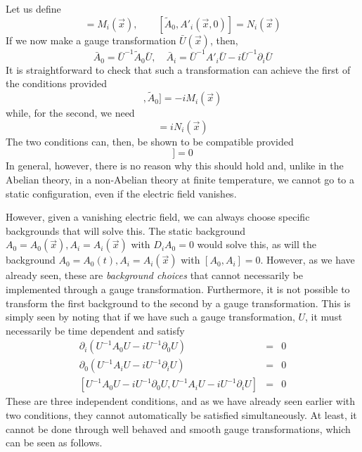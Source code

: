 \documentclass[a4paper,12pt]{article}
\begin{document}
Let us define
\begin{equation}
[\tilde{A}_{0},(\partial_{i}\tilde{A}_{0})] = M_{i}(\vec{x}),\qquad
[\tilde{A}_{0}, A'_{i}(\vec{x},0)] = N_{i}(\vec{x})
\end{equation}
If we now make a gauge transformation $\bar{U}(\vec{x})$, then,
\begin{equation}
\bar{A}_{0} = \bar{U}^{-1}\tilde{A}_{0}\bar{U},\quad \bar{A}_{i} =
\bar{U}^{-1}A'_{i}\bar{U} - i\bar{U}^{-1}\partial_{i}\bar{U}
\end{equation}
It is straightforward to check that such a transformation can achieve
the first of the conditions provided
\begin{equation}
[[\tilde{A}_{0},(\partial_{i}\bar{U})\bar{U}^{-1}],\tilde{A}_{0}] =
-i M_{i}(\vec{x})
\end{equation}
while, for the second, we need
\begin{equation}
[\tilde{A}_{0}, (\partial_{i}\bar{U})\bar{U}^{-1}] = i N_{i}(\vec{x})
\end{equation}
The two conditions can, then, be shown to be compatible provided
\begin{equation}
[\tilde{A}_{0}, \partial_{i}\tilde{A}_{0} +
i[A'_{i}(\vec{x},0),\tilde{A}_{0}]] = 0
\end{equation}
In general, however, there is no reason why this should
hold and, unlike in the Abelian theory, in a non-Abelian theory at
finite temperature, we cannot go to a static configuration, even if
the electric field vanishes.

However, given a vanishing electric field, we can always choose
specific backgrounds that will solve this. The static background
$A_{0}=A_{0}(\vec{x}),A_{i}=A_{i}(\vec{x})$ with $D_{i}A_{0} = 0$
would solve this, as will the background
$A_{0}=A_{0}(t),A_{i}=A_{i}(\vec{x})$ with $[A_{0},A_{i}]=0$. However,
as we have already seen,
these are {\em background choices} that cannot necessarily be implemented
through a gauge transformation. Furthermore, it is not possible to
transform the first background to the second by a gauge
transformation. This is simply seen by noting that if we have such a
gauge  transformation, $U$, it must necessarily be time dependent and
satisfy
\begin{eqnarray}
\partial_{i}\left(U^{-1}A_{0}U - iU^{-1}\partial_{0}U\right) & = &
0\nonumber\\
\partial_{0}\left(U^{-1}A_{i}U - iU^{-1}\partial_{i}U\right) & = &
0\nonumber\\
\left[U^{-1}A_{0}U - iU^{-1}\partial_{0}U , U^{-1}A_{i}U -
iU^{-1}\partial_{i}U\right] & = & 0
\end{eqnarray}
These are three independent conditions, and as we have already seen
earlier with two conditions, they cannot automatically be satisfied
simultaneously. At least, it cannot be done through well behaved and
smooth gauge transformations, which can be seen as follows.
\end{document}

